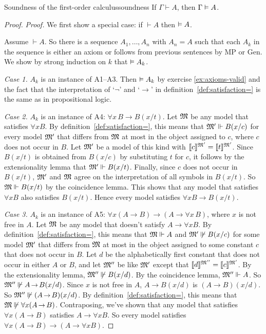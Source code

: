 \begin{theorem}{Soundness of the first-order calculus}{soundness}
  If $\Gamma \vdash A$, then $\Gamma \vDash A$.
\end{theorem}
\begin{proof}
  \emph{Proof.}
  We first show a special case:
  if $\vdash A$ then $\vDash A$.

  Assume $\vdash A$.
  So there is a sequence $A_{1},\dots,A_{n}$ with $A_n = A$ such that
  each $A_{k}$ in the sequence is
  either an axiom or follows from previous sentences by MP or Gen.
  We show by strong induction on $k$ that $\vDash A_{k}$.

  \textit{Case 1.} $A_{k}$ is an instance of A1--A3.
  Then $\vDash A_{k}$ by exercise \ref{ex:axioms-valid}
  and the fact that
  the interpretation of `$\neg$' and `$\to$' in definition~\ref{def:satisfaction=} is the same as in propositional logic.

  \textit{Case 2.} $A_{k}$ is an instance of A4: $\forall x\,B \to B(x/t)$.
  Let $\mathfrak{M}$ be any model that satisfies $\forall x B$.
  By definition~\ref{def:satisfaction=},
  this means that $\mathfrak{M}' \Vdash B(x/c)$ for every model $\mathfrak{M}'$ that differs from $\mathfrak{M}$ at most in the object assigned to $c$,
  where $c$ does not occur in $B$.
  Let $\mathfrak{M}'$ be a model of this kind with $\llbracket c \rrbracket^{\mathfrak{M}'} = \llbracket t \rrbracket^{\mathfrak{M'}}$.
  Since $B(x/t)$ is obtained from $B(x/c)$ by substituting $t$ for $c$,
  it follows by the extensionality lemma that
  $\mathfrak{M}' \Vdash B(x/t)$.
  Finally,
  since $c$ does not occur in $B(x/t)$,
  $\mathfrak{M}'$ and $\mathfrak{M}$ agree on the interpretation of
  all symbols in $B(x/t)$.
  So $\mathfrak{M} \Vdash B(x/t)$ by the coincidence lemma.
  This shows that any model that satisfies $\forall x B$ also satisfies $B(x/t)$.
  Hence every model satisfies $\forall x B \to B(x/t)$.

  \textit{Case 3.} $A_{k}$ is an instance of A5: $\forall x (A\to B)\to(A\to\forall x\,B)$,
  where $x$ is not free in $A$.
  Let $\mathfrak{M}$ be any model that doesn't satisfy $A \to \forall x B$.
  By definition~\ref{def:satisfaction=},
  this means that
  $\mathfrak{M} \Vdash A$ and
  $\mathfrak{M}' \not\Vdash B(x/c)$ for some model $\mathfrak{M}'$
  that differs from $\mathfrak{M}$ at most in the object assigned to some constant $c$
  that does not occur in $B$.
  Let $d$ be the alphabetically first constant that does not occur in either $A$ or $B$,
  and let $\mathfrak{M}''$ be like $\mathfrak{M}'$ except that
  $\llbracket d \rrbracket^{\mathfrak{M}''} = \llbracket c \rrbracket^{\mathfrak{M}'}$.
  By the extensionality lemma,
  $\mathfrak{M}'' \not\Vdash B(x/d)$.
  By the coincidence lemma,
  $\mathfrak{M}'' \Vdash A$.
  So $\Mod{M}'' \not\satisfies A\to B(x/d)$.
  Since $x$ is not free in $A$,
  $A \to B(x/d)$ is $(A \to B)(x/d)$.
  So $\Mod{M}'' \not\satisfies (A \to B)(x/d)$.
  By definition~\ref{def:satisfaction=},
  this means that
  $\Mod{M} \not\satisfies \forall x (A\to B)$.
  Contraposing,
  we've shown that
  any model that satisfies $\forall x (A\to B)$ satisfies $A \to \forall x B$.
  So every model satisfies $\forall x (A\to B)\to(A\to\forall x B)$.


\end{proof}
